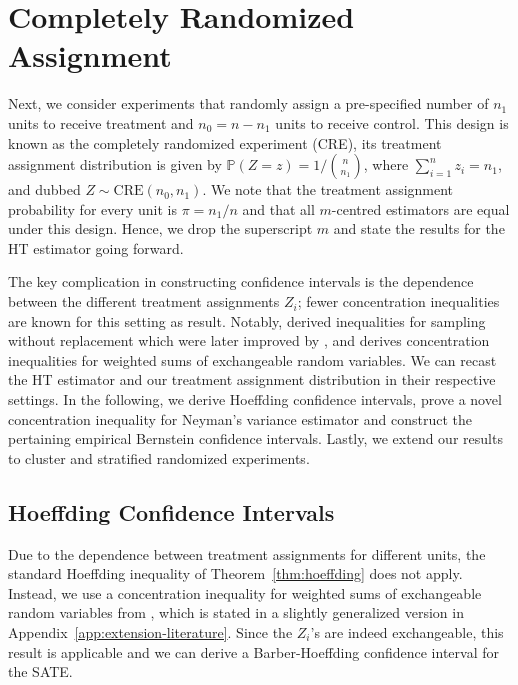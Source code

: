 \documentclass[aos]{imsart2}
\theoremstyle{plain}
\theoremstyle{definition}
\newcommand{\PR}{\mathbb{P}}
\newcommand{\cre}{\mathrm{CRE}}
\begin{document}
\section{Completely Randomized Assignment}\label{sec:cre} Next, we consider experiments that randomly assign a pre-specified number of $n_1$ units to receive treatment and $n_0 = n-n_1$ units to receive control. This design is known as the completely randomized experiment (CRE), its treatment assignment distribution is given by $\PR(Z=z) = 1\big/\binom{n}{n_1}$, where $\sum_{i=1}^n z_i = n_1$, and dubbed $Z \sim \cre(n_0,n_1)$. We note that the treatment assignment probability for every unit is $\pi = n_1/n$ and that all $m$-centred estimators are equal under this design. Hence, we drop the superscript $m$ and state the results for the HT estimator going forward.

The key complication in constructing confidence intervals is the dependence between the different treatment assignments $Z_i$; fewer concentration inequalities are known for this setting as result. Notably, \citet{serfling_probability_1974} derived inequalities for sampling without replacement which were later improved by \citet{bardenet_concentration_2015}, and \citet{barber_hoeffding_2024} derives concentration inequalities for weighted sums of exchangeable random variables. We can recast the HT estimator and our treatment assignment distribution in their respective settings. In the following, we derive Hoeffding confidence intervals, prove a novel concentration inequality for Neyman's variance estimator and construct the pertaining empirical Bernstein confidence intervals. Lastly, we extend our results to cluster and stratified randomized experiments.

\subsection{Hoeffding Confidence Intervals}\label{sec:cre-hoeffding} Due to the dependence between treatment assignments for different units, the standard Hoeffding inequality of Theorem~\ref{thm:hoeffding} does not apply. Instead, we use a concentration inequality for weighted sums of exchangeable random variables from \citet{barber_hoeffding_2024}, which is stated in a slightly generalized version in Appendix~\ref{app:extension-literature}.
Since the $Z_i$'s are indeed exchangeable, this result is applicable and we can derive a Barber-Hoeffding confidence interval for the SATE.
\end{document}
